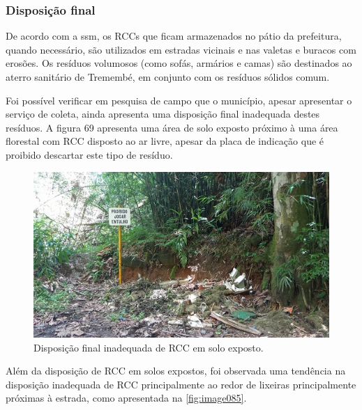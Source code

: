 	
	\subsubsection{Disposição final}
	De acordo com a \gls{ssm}, os RCCs que ficam armazenados no pátio da prefeitura, quando necessário, são utilizados em estradas vicinais e nas valetas e buracos com erosões. Os resíduos volumosos (como sofás, armários e camas) são destinados ao aterro sanitário de Tremembé, em conjunto com os resíduos sólidos comum.
	
	Foi possível verificar em pesquisa de campo que o município, apesar apresentar o serviço de coleta, ainda apresenta uma disposição final inadequada destes resíduos. A figura 69 apresenta uma área de solo exposto próximo à uma área florestal com RCC disposto ao ar livre, apesar da placa de indicação que é proibido descartar este tipo de resíduo.
	
	\begin{figure}
		\centering
		\includegraphics[width=0.75\linewidth]{produtos/prodtres/image084}
		\caption{Disposição final inadequada de RCC em solo exposto.}
		\label{fig:image084}
	\end{figure}
	
	
	Além da disposição de RCC em solos expostos, foi observada uma tendência na disposição inadequada de RCC principalmente ao redor de lixeiras principalmente próximas à estrada, como apresentada na \autoref{fig:image085}.

